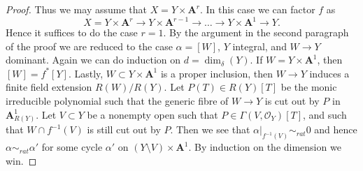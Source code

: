 \begin{proof}
\medskip\noindent
Thus we may assume that $X = Y \times \mathbf{A}^r$.
In this case we can factor $f$ as
$$
X = Y \times \mathbf{A}^r \to
Y \times \mathbf{A}^{r - 1} \to \ldots \to
Y \times \mathbf{A}^1 \to Y.
$$
Hence it suffices to do the case $r = 1$. By the argument in the
second paragraph of the proof we are reduced to the case
$\alpha = [W]$, $Y$ integral, and $W \to Y$ dominant.
Again we can do induction on $d = \dim_\delta(Y)$.
If $W = Y \times \mathbf{A}^1$, then $[W] = f^*[Y]$.
Lastly, $W \subset Y \times \mathbf{A}^1$ is a proper inclusion,
then $W \to Y$ induces a finite field extension $R(W)/R(Y)$.
Let $P(T) \in R(Y)[T]$ be the monic irreducible polynomial such
that the generic fibre of $W \to Y$ is cut out by $P$ in
$\mathbf{A}^1_{R(Y)}$. Let $V \subset Y$ be a nonempty open such
that $P \in \Gamma(V, \mathcal{O}_Y)[T]$, and such that
$W \cap f^{-1}(V)$ is still cut out by $P$. Then we see that
$\alpha|_{f^{-1}(V)} \sim_{rat} 0$ and hence $\alpha \sim_{rat} \alpha'$
for some cycle $\alpha'$ on $(Y \setminus V) \times \mathbf{A}^1$.
By induction on the dimension we win.
\end{proof}